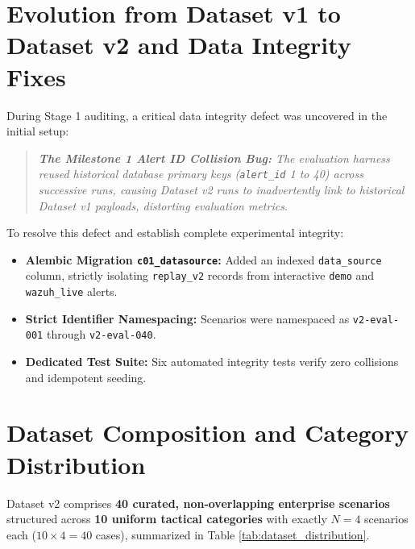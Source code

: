 \section{Evolution from Dataset v1 to Dataset v2 and Data Integrity Fixes}
\label{sec:dataset_evolution}
During Stage 1 auditing, a critical data integrity defect was uncovered in the initial setup:
\begin{quote}
\itshape
\textbf{The Milestone 1 Alert ID Collision Bug:} The evaluation harness reused historical database primary keys (\texttt{alert\_id} 1 to 40) across successive runs, causing Dataset v2 runs to inadvertently link to historical Dataset v1 payloads, distorting evaluation metrics.
\end{quote}
To resolve this defect and establish complete experimental integrity:
\begin{itemize}
    \item \textbf{Alembic Migration \texttt{c01\_datasource}:} Added an indexed \texttt{data\_source} column, strictly isolating \texttt{replay\_v2} records from interactive \texttt{demo} and \texttt{wazuh\_live} alerts.
    \item \textbf{Strict Identifier Namespacing:} Scenarios were namespaced as \texttt{v2-eval-001} through \texttt{v2-eval-040}.
    \item \textbf{Dedicated Test Suite:} Six automated integrity tests verify zero collisions and idempotent seeding.
\end{itemize}

\section{Dataset Composition and Category Distribution}
\label{sec:dataset_composition}
Dataset v2 comprises \textbf{40 curated, non-overlapping enterprise scenarios} structured across \textbf{10 uniform tactical categories} with exactly $N = 4$ scenarios each ($10 \times 4 = 40$ cases), summarized in Table \ref{tab:dataset_distribution}.

